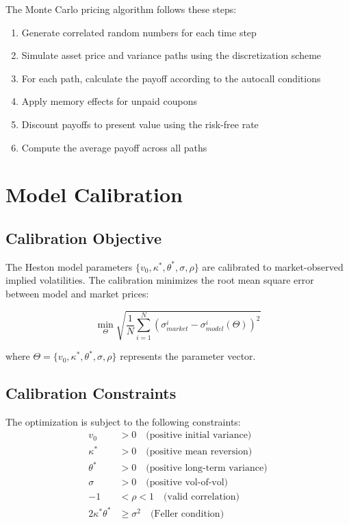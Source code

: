 \documentclass[12pt,a4paper]{article}
\begin{document}
The Monte Carlo pricing algorithm follows these steps:

\begin{enumerate}
    \item Generate correlated random numbers for each time step
    \item Simulate asset price and variance paths using the discretization scheme
    \item For each path, calculate the payoff according to the autocall conditions
    \item Apply memory effects for unpaid coupons
    \item Discount payoffs to present value using the risk-free rate
    \item Compute the average payoff across all paths
\end{enumerate}

\section{Model Calibration}

\subsection{Calibration Objective}

The Heston model parameters $\{v_0, \kappa^*, \theta^*, \sigma, \rho\}$ are calibrated to market-observed implied volatilities. The calibration minimizes the root mean square error between model and market prices:

\begin{equation}
\min_{\Theta} \sqrt{\frac{1}{N} \sum_{i=1}^{N} \left(\sigma_{market}^i - \sigma_{model}^i(\Theta)\right)^2}
\end{equation}

where $\Theta = \{v_0, \kappa^*, \theta^*, \sigma, \rho\}$ represents the parameter vector.

\subsection{Calibration Constraints}

The optimization is subject to the following constraints:
\begin{align}
v_0 &> 0 \quad \text{(positive initial variance)}\\
\kappa^* &> 0 \quad \text{(positive mean reversion)}\\
\theta^* &> 0 \quad \text{(positive long-term variance)}\\
\sigma &> 0 \quad \text{(positive vol-of-vol)}\\
-1 &< \rho < 1 \quad \text{(valid correlation)}\\
2\kappa^*\theta^* &\geq \sigma^2 \quad \text{(Feller condition)}
\end{align}
\end{document}

